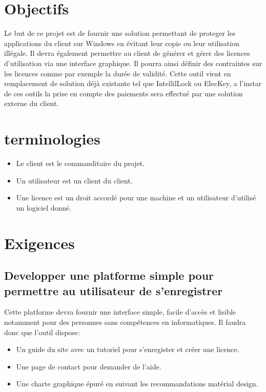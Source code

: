 \chapter{Objectifs}

Le but de ce projet est de fournir une solution permettant de proteger les 
applications du client sur Windows en évitant leur copie ou leur utilisation illégale. 
Il devra également permettre au client de générer et gérer des licences d'utilisation 
via une interface graphique. Il pourra ainsi définir des contraintes sur les licences 
comme par exemple la durée de validité. \newline
Cette outil vient en remplacement de solution déjà existante tel que 
	IntellilLock ou ElecKey, a l'instar de ces outils la prise en compte des paiements sera effectué par une solution externe du client.

\chapter{terminologies}

\begin{itemize}
	\item Le client est le commanditaire du projet.
	\item Un utilisateur est un client du client. 
	\item Une licence est un droit accordé pour une machine et un utilisateur d'utilisé un logiciel donné.
\end{itemize}

\chapter{Exigences}

\section{Developper une platforme simple pour permettre au utilisateur de s'enregistrer}
Cette platforme devra fournir une interface simple, facile d'accès et lisible notamment 
pour des personnes sans compétences en informatiques. Il faudra donc que l'outil dispose:
\begin{itemize}
	\item Un guide du site avec un tutoriel pour s'enregister et créer une licence.
	\item Une page de contact pour demander de l'aide.
	\item Une charte graphique épuré en suivant les recommandations matérial design.
\end{itemize}

